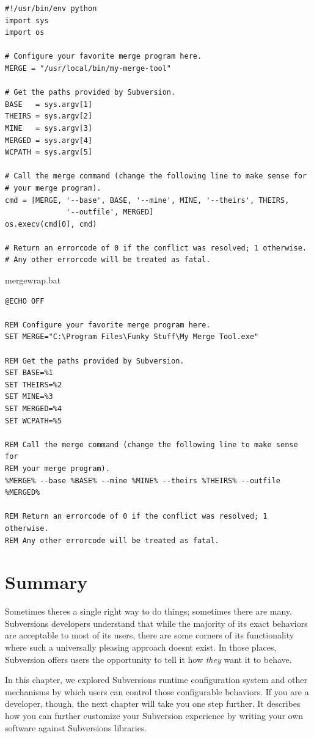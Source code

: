 \begin{verbatim}
#!/usr/bin/env python
import sys
import os

# Configure your favorite merge program here.
MERGE = "/usr/local/bin/my-merge-tool"

# Get the paths provided by Subversion.
BASE   = sys.argv[1]
THEIRS = sys.argv[2]
MINE   = sys.argv[3]
MERGED = sys.argv[4]
WCPATH = sys.argv[5]

# Call the merge command (change the following line to make sense for
# your merge program).
cmd = [MERGE, '--base', BASE, '--mine', MINE, '--theirs', THEIRS,
              '--outfile', MERGED]
os.execv(cmd[0], cmd)

# Return an errorcode of 0 if the conflict was resolved; 1 otherwise.
# Any other errorcode will be treated as fatal.
\end{verbatim}

\protect{}\label{svn.advanced.externaldifftools.merge.ex-2}
mergewrap.bat

\begin{verbatim}
@ECHO OFF

REM Configure your favorite merge program here.
SET MERGE="C:\Program Files\Funky Stuff\My Merge Tool.exe"

REM Get the paths provided by Subversion.
SET BASE=%1
SET THEIRS=%2
SET MINE=%3
SET MERGED=%4
SET WCPATH=%5

REM Call the merge command (change the following line to make sense for
REM your merge program).
%MERGE% --base %BASE% --mine %MINE% --theirs %THEIRS% --outfile %MERGED%

REM Return an errorcode of 0 if the conflict was resolved; 1 otherwise.
REM Any other errorcode will be treated as fatal.
\end{verbatim}

\section{Summary}\label{svn.customization.summary}

Sometimes there\textquotesingle s a single right way to do things;
sometimes there are many. Subversion\textquotesingle s developers
understand that while the majority of its exact behaviors are acceptable
to most of its users, there are some corners of its functionality where
such a universally pleasing approach doesn\textquotesingle t exist. In
those places, Subversion offers users the opportunity to tell it how
\emph{they} want it to behave.

In this chapter, we explored Subversion\textquotesingle s runtime
configuration system and other mechanisms by which users can control
those configurable behaviors. If you are a developer, though, the next
chapter will take you one step further. It describes how you can further
customize your Subversion experience by writing your own software
against Subversion\textquotesingle s libraries.


